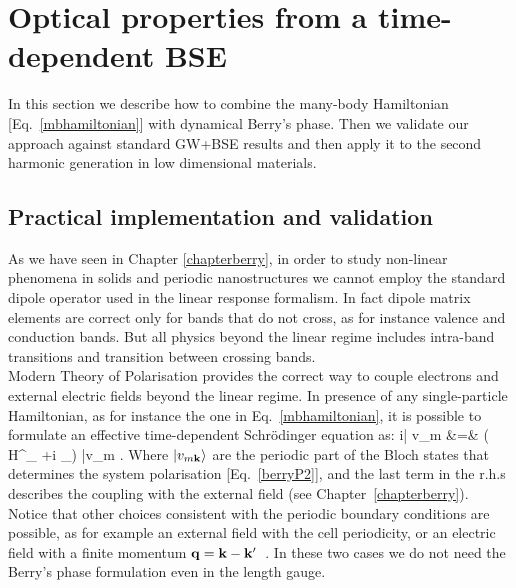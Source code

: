 \section{Optical properties from a time-dependent BSE}
\label{ss:solution}
In this section we describe how to combine the many-body Hamiltonian [Eq.~\ref{mbhamiltonian}] with dynamical Berry's phase. Then we validate our approach against standard GW+BSE results and then apply it to the second harmonic generation in low dimensional materials. 
\label{teospectro}      
\subsection{Practical implementation and validation}
As we have seen in Chapter \ref{chapterberry}, in order to study non-linear phenomena in solids and periodic nanostructures we cannot employ the standard dipole operator used in the linear response formalism. In fact dipole matrix elements are correct only for bands that do not cross, as for instance valence and conduction bands.\cite{blount} But all physics beyond the linear regime includes intra-band transitions and transition between crossing bands.\\
Modern Theory of Polarisation\cite{souza_prb,nloptics2013} provides the correct way to couple electrons and external electric fields beyond the linear regime. In presence of any single-particle Hamiltonian, as for instance the one in Eq.~\ref{mbhamiltonian}, it is possible to formulate an effective time-dependent Schr\"odinger equation as:
\bea
i\hbar  {}| v_{m\kk} \rangle &=& \left( H^{}_{\kk} +i \efield \cdot \tilde \partial_\kk\right) |v_{m\kk} \rangle \label{tdbse_shf}.
\eea
Where $| v_{m{\bf k}} \rangle$ are the periodic part of the Bloch states that determines the system polarisation [Eq.~\ref{berryP2}], and the last term in the r.h.s describes the coupling with the external field (see Chapter~\ref{chapterberry}).
Notice that other choices consistent with the periodic boundary
conditions are possible, as for example an external field
with the cell periodicity\cite{PhysRevLett.87.036401}, or an electric
field  with a finite momentum $\mathbf q = {\bf k}-{\bf k}'$~\cite{PhysRevLett.84.1768}. In these two cases we do not need the Berry's phase formulation even in the length gauge.\\

